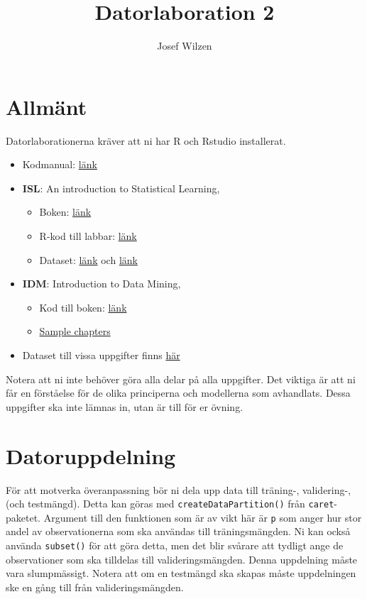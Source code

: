 \documentclass[a4paper]{article}
\title{Datorlaboration 2}
\author{Josef Wilzen}
\begin{document}
\maketitle
\thispagestyle{fancy}


\section*{Allmänt}

Datorlaborationerna kräver att ni har R och Rstudio installerat.
\begin{itemize}
    \item Kodmanual: \href{https://www.isakhietala.com/teaching/732g12/}{länk}
    \item \textbf{ISL}: An introduction to Statistical Learning,
    \begin{itemize}
        \item Boken: \href{https://www.statlearning.com/}{länk}
        \item R-kod till labbar: \href{https://www.statlearning.com/resources-second-edition}{länk}
        \item Dataset: \href{https://cran.r-project.org/web/packages/ISLR2/index.html}{länk} och \href{https://www.statlearning.com/resources-second-edition}{länk}
    \end{itemize}
    \item \textbf{IDM}: Introduction to Data Mining,
    \begin{itemize}
        \item Kod till boken: \href{https://mhahsler.github.io/Introduction_to_Data_Mining_R_Examples/}{länk}
        \item \href{https://www-users.cse.umn.edu/~kumar001/dmbook/index.php#chapters}{Sample chapters}
    \end{itemize}
    \item Dataset till vissa uppgifter finns \href{https://github.com/STIMALiU/732G12_DM/tree/2023/data}{här}
\end{itemize}
Notera att ni inte behöver göra alla delar på alla uppgifter. Det viktiga är att ni får en förståelse för de olika principerna och modellerna som avhandlats. Dessa uppgifter ska inte lämnas in, utan är till för er övning.

\section*{Datoruppdelning}

För att motverka överanpassning bör ni dela upp data till träning-, validering-, (och testmängd). Detta kan göras med \texttt{createDataPartition()} från \texttt{caret}-paketet. Argument till den funktionen som är av vikt här är \texttt{p} som anger hur stor andel av observationerna som ska användas till träningsmängden. Ni kan också använda \texttt{subset()} för att göra detta, men det blir svårare att tydligt ange de observationer som ska tilldelas till valideringsmängden. Denna uppdelning måste vara slumpmässigt. Notera att om en testmängd ska skapas måste uppdelningen ske en gång till från valideringsmängden.
\end{document}
